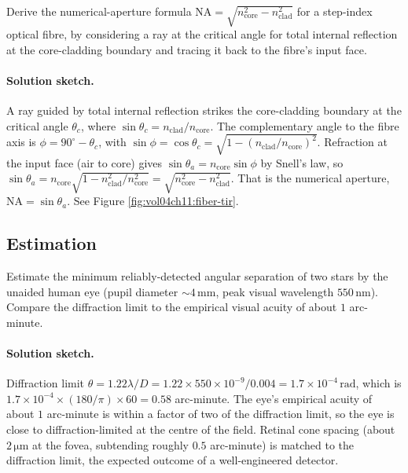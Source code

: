\begin{exercise}
Derive the numerical-aperture formula $\text{NA} = \sqrt{n_{\text{
core}}^{2}-n_{\text{clad}}^{2}}$ for a step-index optical fibre, by
considering a ray at the critical angle for total internal reflection
at the core-cladding boundary and tracing it back to the fibre's
input face.
\paragraph{Solution sketch.} A ray guided by total internal reflection
strikes the core-cladding boundary at the critical angle
$\theta_{c}$, where $\sin\theta_{c} = n_{\text{clad}}/n_{\text{core}}$.
The complementary angle to the fibre axis is
$\phi = 90^{\circ} - \theta_{c}$, with
$\sin\phi = \cos\theta_{c} = \sqrt{1 - (n_{\text{clad}}/n_{\text{core}})
^{2}}$. Refraction at the input face (air to core) gives
$\sin\theta_{a} = n_{\text{core}}\sin\phi$ by Snell's law, so
$\sin\theta_{a} = n_{\text{core}}\sqrt{1 - n_{\text{clad}}^{2}/
n_{\text{core}}^{2}} = \sqrt{n_{\text{core}}^{2} - n_{\text{clad}}^{2}}$.
That is the numerical aperture, $\text{NA} = \sin\theta_{a}$. See Figure
\ref{fig:vol04ch11:fiber-tir}.
\end{exercise}

\subsection*{Estimation}

\begin{exercise}
Estimate the minimum reliably-detected angular separation of two
stars by the unaided human eye (pupil diameter $\sim 4\,\si{\milli
\meter}$, peak visual wavelength $550\,\si{\nano\meter}$). Compare
the diffraction limit to the empirical visual acuity of about
$1$ arc-minute.
\paragraph{Solution sketch.} Diffraction limit
$\theta = 1.22\lambda/D = 1.22\times 550\times10^{-9}/0.004 =
1.7\times10^{-4}\,\si{\radian}$, which is
$1.7\times10^{-4}\times(180/\pi)\times 60 = 0.58$ arc-minute. The eye's
empirical acuity of about $1$ arc-minute is within a factor of two of
the diffraction limit, so the eye is close to diffraction-limited at the
centre of the field. Retinal cone spacing (about $2\,\si{\micro\meter}$
at the fovea, subtending roughly $0.5$ arc-minute) is matched to the
diffraction limit, the expected outcome of a well-engineered detector.
\end{exercise}

